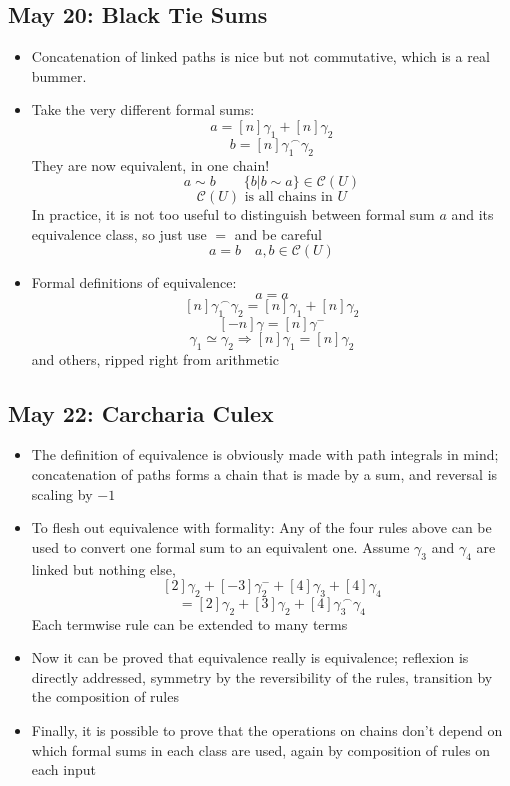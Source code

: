 \documentclass[10pt, oneside]{article}
\newcommand{\cat}{^{\,\smallfrown}}
\begin{document}
\subsection{May 20: Black Tie Sums}
\begin{itemize}
    \item Concatenation of linked paths is nice but not commutative, which is a real bummer. 
    \item Take the very different formal sums:
            \[a = [n] \gamma_1 + [n]\gamma_2\]
            \[b = [n] \gamma_1 \cat \gamma_2\]
        They are now equivalent, in one chain!
            \[a \sim b \quad \quad \{b | b \sim a\} \in \mathcal{C} (U)\]
            \[\mathcal{C} (U) \text{ is all chains in } U\]
        In practice, it is not too useful to distinguish between formal sum $a$ and its equivalence class, so just use $=$ and be careful
            \[a = b \quad a, b \in \mathcal{C} (U)\]
    \item Formal definitions of equivalence:
            \[a = a\]
            \[[n] \gamma_1 \cat \gamma_2 = [n] \gamma_1 + [n] \gamma_2\]
            \[[-n] \gamma = [n] \gamma^-\]
            \[\gamma_1 \simeq \gamma_2 \Rightarrow [n]\gamma_1 = [n]\gamma_2\]
        and others, ripped right from arithmetic
\end{itemize}

\subsection{May 22: Carcharia Culex}
\begin{itemize}
    \item The definition of equivalence is obviously made with path integrals in mind; concatenation of paths forms a chain that is made by a sum, and reversal is scaling by $-1$
    \item To flesh out equivalence with formality: Any of the four rules above can be used to convert one formal sum to an equivalent one. Assume $\gamma_3$ and $\gamma_4$ are linked but nothing else,
            \[[2]\gamma_2 + [-3]\gamma_2^- + [4]\gamma_3 + [4]\gamma_4\]
            \[= [2]\gamma_2 + [3]\gamma_2 + [4]\gamma_3 \cat \gamma_4\]
        Each termwise rule can be extended to many terms
    \item Now it can be proved that equivalence really is equivalence; reflexion is directly addressed, symmetry by the reversibility of the rules, transition by the composition of rules
    \item Finally, it is possible to prove that the operations on chains don't depend on which formal sums in each class are used, again by composition of rules on each input
\end{itemize}
\end{document}
